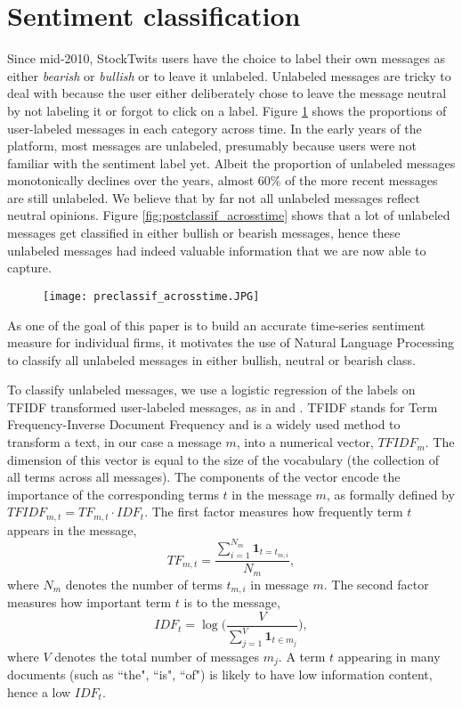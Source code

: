 \section{Sentiment classification}\label{S:classification}

Since mid-2010, StockTwits users have the choice to label their own messages as either \textit{bearish} or \textit{bullish} or to leave it unlabeled. Unlabeled messages are tricky to deal with because the user either deliberately chose to leave the message neutral by not labeling it or forgot to click on a label. Figure \ref{fig:ts_neutral_vs_uncl} shows the proportions of user-labeled messages in each category across time. In the early years of the platform, most messages are unlabeled, presumably because users were not familiar with the sentiment label yet. Albeit the proportion of unlabeled messages monotonically declines over the years, almost 60\% of the more recent messages are still unlabeled. We believe that by far not all unlabeled messages reflect neutral opinions. Figure \ref{fig:postclassif_acrosstime} shows that a lot of unlabeled messages get classified in either bullish or bearish messages, hence these unlabeled messages had indeed valuable information that we are now able to capture. 

\begin{figure}[h]
    \centering
    \texttt{[image: preclassif\_acrosstime.JPG]}
    \label{fig:ts_neutral_vs_uncl}
\end{figure}


As one of the goal of this paper is to build an accurate time-series sentiment measure for individual firms, it motivates the use of Natural Language Processing to classify all unlabeled messages in either bullish, neutral or bearish class.

To classify unlabeled messages, we use a logistic regression of the labels on TFIDF transformed user-labeled messages, as in \citet{nlp1} and \citet{classifq}. TFIDF stands for Term Frequency-Inverse Document Frequency and is a widely used method to transform a text, in our case a message $m$, into a numerical vector, $TFIDF_m$. The dimension of this vector is equal to the size of the vocabulary (the collection of all terms across all messages). The components of the vector encode the importance of the corresponding terms $t$ in the message $m$, as formally defined by $TFIDF_{m,t} = TF_{m,t} \cdot IDF_t$. The first factor measures how frequently term $t$ appears in the message,
\[ TF_{m,t} =\dfrac{\sum_{i=1}^{N_m} \textbf{1}_{t=t_{m,i}}}{N_m},\]
where $N_m$ denotes the number of terms $t_{m,i}$ in message $m$. The second factor measures how important term $t$ is to the message,
\[ IDF_t = \log \big(\dfrac{V}{\sum_{j=1}^{V} \textbf{1}_{t \in m_j}}\big),\]
where $V$ denotes the total number of messages $m_j$. A term $t$ appearing in many documents (such as ``the", ``is", ``of") is likely to have low information content, hence a low $IDF_t$. 

